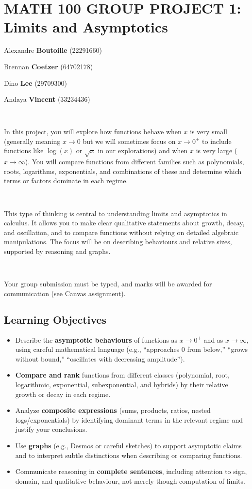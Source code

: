 \documentclass[answers,addpoints]{exam}
\begin{document}
\section*{MATH 100 GROUP PROJECT 1: Limits and Asymptotics}

Alexandre \textbf{Boutoille} (22291660)

Brennan \textbf{Coetzer} (64702178)

Dino \textbf{Lee} (29709300)

Andaya \textbf{Vincent} (33234436)

\normalsize

\

{{In this project, you will explore how functions behave when $x$ is very small (generally meaning $x \to 0$ but we will sometimes focus on $x \to 0^+$ to include functions like $\log(x)$ or $\sqrt{x}$ in our explorations) and when $x$ is very large ($x \to \infty$). You will compare functions from different families such as polynomials, roots, logarithms, exponentials, and combinations of these and determine which terms or factors dominate in each regime.}

  \

  {This type of thinking is central to understanding limits and asymptotics in calculus. It allows you to make clear qualitative statements about growth, decay, and oscillation, and to compare functions without relying on detailed algebraic manipulations. The focus will be on describing behaviours and relative sizes, supported by reasoning and graphs.}
}

\

Your group submission must be typed, and marks will be awarded for communication (see Canvas assignment).
\subsection*{Learning Objectives}
\begin{itemize}
  \item Describe the \textbf{asymptotic behaviours} of functions as $x \to 0^+$ and as $x \to \infty$, using careful mathematical language (e.g., “approaches $0$ from below,” “grows without bound,” “oscillates with decreasing amplitude”).
  \item \textbf{Compare and rank} functions from different classes (polynomial, root, logarithmic, exponential, subexponential, and hybrids) by their relative growth or decay in each regime.
  \item Analyze \textbf{composite expressions} (sums, products, ratios, nested logs/exponentials) by identifying dominant terms in the relevant regime and justify your conclusions.
  \item Use \textbf{graphs} (e.g., Desmos or careful sketches) to support asymptotic claims and to interpret subtle distinctions when describing or comparing functions.
  \item Communicate reasoning in \textbf{complete sentences}, including attention to sign, domain, and qualitative behaviour, not merely though computation of limits.
\end{itemize}
\end{document}
